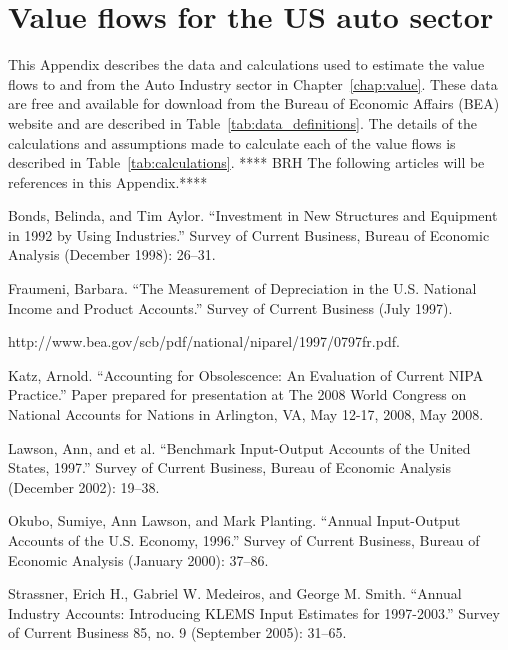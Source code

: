 %
%
%
\chapter{Value flows for the US auto sector}
\label{chap:auto_value_flows} 


This Appendix describes the data and calculations used to estimate the value flows to and from the Auto Industry sector in Chapter~\ref{chap:value}. These data are free and available for download from the Bureau of Economic Affairs (BEA) website
and are described in Table~\ref{tab:data_definitions}. The details of the calculations and assumptions made to calculate 
each of the value flows is described in 
Table~\ref{tab:calculations}. **** BRH The following articles will be references in this Appendix.****

Bonds, Belinda, and Tim Aylor. “Investment in New Structures and Equipment in 1992 by Using Industries.” Survey of Current Business, Bureau of Economic Analysis (December 1998): 26–31.

Fraumeni, Barbara. “The Measurement of Depreciation in the U.S. National Income and Product Accounts.” Survey of Current Business (July 1997). 

http://www.bea.gov/scb/pdf/national/niparel/1997/0797fr.pdf.

Katz, Arnold. “Accounting for Obsolescence: An Evaluation of Current NIPA Practice.” Paper prepared for presentation at The 2008 World Congress on National Accounts for Nations  in Arlington, VA, May 12-17, 2008, May 2008.

Lawson, Ann, and et al. “Benchmark Input-Output Accounts of the United States,  1997.” Survey of Current Business, Bureau of Economic Analysis (December 2002): 19–38.

Okubo, Sumiye, Ann Lawson, and Mark Planting. “Annual Input-Output Accounts of the U.S. Economy, 1996.” Survey of Current Business, Bureau of Economic Analysis (January 2000): 37–86.

Strassner, Erich H., Gabriel W. Medeiros, and George M. Smith. “Annual Industry Accounts: Introducing KLEMS Input Estimates for 1997-2003.” Survey of Current Business 85, no. 9 (September 2005): 31–65.



